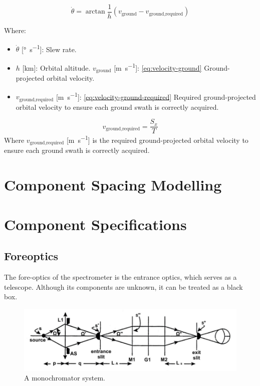 \documentclass{article}
\begin{document}
\begin{equation} \label{eq:slew-rate}
    \dot{\theta} = \arctan{\frac{1}{h}\left( v_{\text{ground}} - v_{\text{ground,required}} \right)}
\end{equation}

Where:
\begin{itemize}[label={}]
    \item $\dot{\theta}$ [\si{\degree\per\s}]: Slew rate.
    \item $h$ [\si{\km}]: Orbital altitude.
    $v_{\text{ground}}$ [\si{\m\per\s}]: \eqref{eq:velocity-ground} Ground-projected orbital velocity.
    \item $v_{\text{ground,required}}$ [\si{\m\per\s}]: \eqref{eq:velocity-ground-required} Required ground-projected orbital velocity to ensure each ground swath is correctly acquired.
\end{itemize}

\begin{equation} \label{eq:velocity-ground-required}
    v_{\text{ground,required}} = \frac{S_x}{T} 
\end{equation}
Where $v_{\text{ground,required}}$ [\si{\m\per\s}] is the required ground-projected orbital velocity to ensure each ground swath is correctly acquired.


\section{Component Spacing Modelling}

\section{Component Specifications}

\subsection{Foreoptics}
The fore-optics of the spectrometer is the entrance optics, which serves as a telescope. Although its components are unknown, it can be treated as a black box.

\begin{figure}[H]
\centering
\includegraphics[width=1\textwidth]{figures/monochromator.PNG}
\caption{A monochromator system. \cite{Horiba_throughput_etendue}}
\label{fig:monochromator}
\end{figure}
\end{document}
